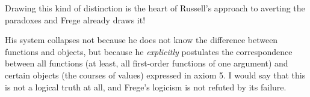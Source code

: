 \documentclass[12pt]{article}
\begin{document}
Drawing this kind of distinction is the heart of Russell's approach to averting the paradoxes and Frege already draws it!

His system collapses not because he does not know the difference between functions and objects, but because he {\em explicitly\/} postulates the correspondence between all functions
(at least, all first-order functions of one argument) and certain objects (the courses of values) expressed in axiom 5.  I would say that this is not a logical truth at all, and Frege's logicism is not refuted by its failure.
\end{document}
